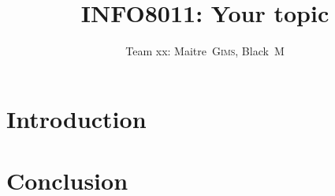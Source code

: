 \documentclass[conference]{IEEEtran}
\newcommand{\MyTitle}{Your topic}
\newcommand{\TeamID}{xx} %
\newcommand{\FirstNameONE}{Maitre}
\newcommand{\LastNameONE}{Gims}
\newcommand{\FirstNameTWO}{Black}
\newcommand{\LastNameTWO}{M}
\begin{document}
\title{INFO8011: \MyTitle}
\author{Team \TeamID : \FirstNameONE~\textsc{\LastNameONE},
\FirstNameTWO~\textsc{\LastNameTWO}
}

\maketitle

\section{Introduction}\label{introduction}

\section{Conclusion}\label{conclusion}

\small{
\balance


}
\end{document}
